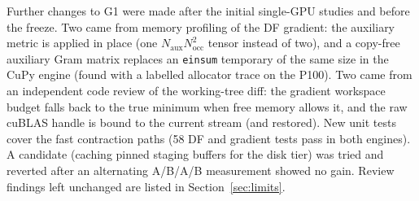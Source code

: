 Further changes to G1 were made after the initial single-GPU studies and before the freeze. Two came from memory profiling of the DF gradient: the auxiliary metric is applied in place (one $N_\mathrm{aux}N_\mathrm{occ}^2$ tensor instead of two), and a copy-free auxiliary Gram matrix replaces an \texttt{einsum} temporary of the same size in the CuPy engine (found with a labelled allocator trace on the P100). Two came from an independent code review of the working-tree diff: the gradient workspace budget falls back to the true minimum when free memory allows it, and the raw cuBLAS handle is bound to the current stream (and restored). New unit tests cover the fast contraction paths (58 DF and gradient tests pass in both engines). A candidate (caching pinned staging buffers for the disk tier) was tried and reverted after an alternating A/B/A/B measurement showed no gain. Review findings left unchanged are listed in Section~\ref{sec:limits}.
